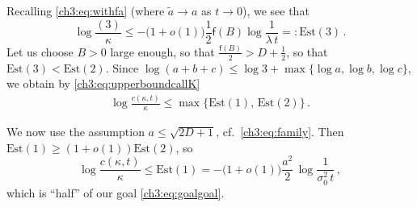 \documentclass[a4paper,reqno,11pt]{amsart}
\numberwithin{equation}{section}
\renewcommand{\tilde}{\widetilde}          %
\newcommand\sff{\mathsf{f}}
\newcommand\blue{\color{blue}}
\begin{document}
Recalling \eqref{ch3:eq:withfa} (where $\tilde a \to a$ as $t\to 0$), we see that
\begin{equation} \label{ch3:eq:est3}
	\log \frac{(3)}{\kappa} \le -\big(1+o(1)\big)\frac{1}{2} \sff(B) \log\frac{1}
	{ \lambda \, t}  =: \mathrm{Est}(3) \,.
\end{equation}
Let us choose $B > 0$ large enough, so that $\frac{\sff(B)}{2} > D+\frac{1}{2}$,
so that $\mathrm{Est(3)} < \mathrm{Est(2)}$.
Since $\log (a+b+c) \leq \log 3 +\max \{\log a, \log b, \log c \}$, we obtain
by \eqref{ch3:eq:upperboundcallK}
\begin{equation}\label{ch3:eq:ufa}
\begin{split}
 \log \frac{c(\kappa,t)}{\kappa} \leq 
	\max\big\{
	\mathrm{Est}(1),\, \mathrm{Est}(2) \big\} \,.
\end{split}
\end{equation}

We now use the assumption $a \le \sqrt{2D+1}$,
cf.\ \eqref{ch3:eq:family}. Then
$\mathrm{Est}(1) \ge (1+o(1))\mathrm{Est}(2)$, so
\begin{equation} \label{ch3:eq:halfgoal}
	\log \frac{c(\kappa,t)}{\kappa}
	\le \mathrm{Est}(1)
	= - \big(1+o(1)\big)
	\frac{a^2}{2} \, \log \frac{1}{ \sigma_0^2 \, t} \,,
\end{equation}
which is ``half'' of our goal \eqref{ch3:eq:goalgoal}.
\end{document}
